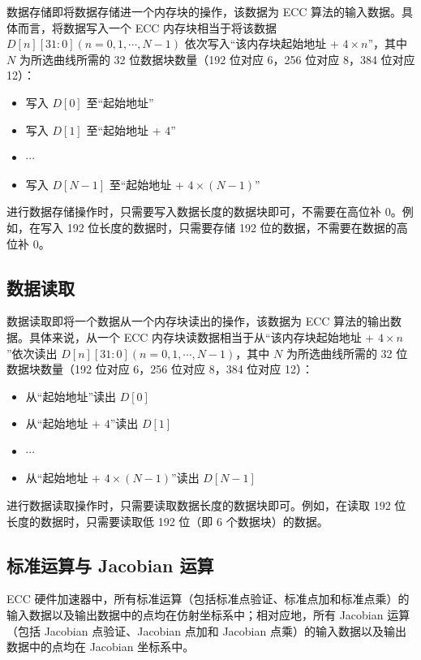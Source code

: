 \documentclass[main\_\_CN.tex]{subfiles}
\begin{document}
数据存储即将数据存储进一个内存块的操作，该数据为 ECC 算法的输入数据。具体而言，将数据写入一个 ECC 内存块相当于将该数据 $D[n][31:0] (n=0, 1, \cdots, N-1)$ 依次写入“该内存块起始地址 + $4 \times n$”，其中 $N$ 为所选曲线所需的 32 位数据块数量（192 位对应 6，256 位对应 8，384 位对应 12）：

\begin{itemize}
    \item 写入 $D[0]$ 至“起始地址”
    \item 写入 $D[1]$ 至“起始地址 + $4$”
    \item $\cdots$
    \item 写入 $D[N-1]$ 至“起始地址 + $4 \times (N-1)$”
\end{itemize}

\begin{tiplisting}
进行数据存储操作时，只需要写入数据长度的数据块即可，不需要在高位补 0。例如，在写入 192 位长度的数据时，只需要存储 192 位的数据，不需要在数据的高位补 0。
\end{tiplisting}

\subsection{数据读取}

数据读取即将一个数据从一个内存块读出的操作，该数据为 ECC 算法的输出数据。具体来说，从一个 ECC 内存块读数据相当于从“该内存块起始地址 + $4 \times n$”依次读出 $D[n][31:0] (n=0, 1, \cdots, N-1)$，其中 $N$ 为所选曲线所需的 32 位数据块数量（192 位对应 6，256 位对应 8，384 位对应 12）：
\begin{itemize}
    \item 从“起始地址”读出 $D[0]$
    \item 从“起始地址 + $4$”读出 $D[1]$
    \item $\cdots$
    \item 从“起始地址 + $4 \times (N-1)$”读出 $D[N-1]$
\end{itemize}

\begin{tiplisting}
进行数据读取操作时，只需要读取数据长度的数据块即可。例如，在读取 192 位长度的数据时，只需要读取低 192 位（即 6 个数据块）的数据。
\end{tiplisting}


\subsection{标准运算与 Jacobian 运算}

\chipname{} ECC 硬件加速器中，所有标准运算（包括标准点验证、标准点加和标准点乘）的输入数据以及输出数据中的点均在仿射坐标系中；相对应地，所有 Jacobian 运算（包括 Jacobian 点验证、Jacobian 点加和 Jacobian 点乘）的输入数据以及输出数据中的点均在 Jacobian 坐标系中。
\end{document}
